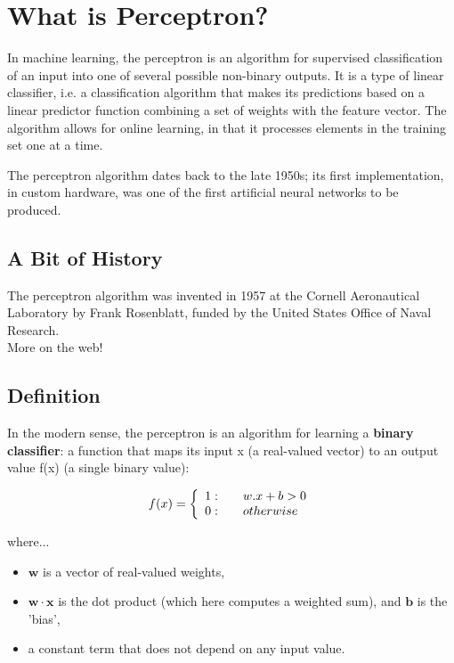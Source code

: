 \chapter{What is Perceptron?}
In machine learning, the perceptron is an algorithm for supervised classification of an input into one of several possible non-binary outputs. It is a type of linear classifier, i.e. a classification algorithm that makes its predictions based on a linear predictor function combining a set of weights with the feature vector. The algorithm allows for online learning, in that it processes elements in the training set one at a time.

The perceptron algorithm dates back to the late 1950s; its first implementation, in custom hardware, was one of the first artificial neural networks to be produced.

\section{A Bit of History}
The perceptron algorithm was invented in 1957 at the Cornell Aeronautical Laboratory by Frank Rosenblatt, funded by the United States Office of Naval Research. \hfill \\

More on the web!

\section{Definition}
In the modern sense, the perceptron is an algorithm for learning a \textbf{binary classifier}: a function that maps its input x (a real-valued vector) to an output value f(x) (a single binary value):

\[ f(x) = \left\{ 
               \begin{array}{l l}
                1  : & \quad w.x+b > 0 \\
                0  : & \quad otherwise
               \end{array} 
       \right.
\]

where...
\begin{itemize}
\item $\mathbf{w}$ is a vector of real-valued weights, 
\item $\mathbf{w \cdot x}$ is the dot product (which here computes a weighted sum), and $\mathbf{b}$ is the 'bias', 
\item a constant term that does not depend on any input value.
\end{itemize}

